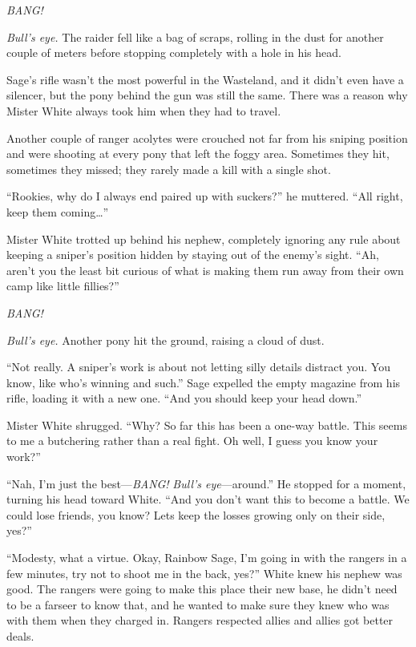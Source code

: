 \emph{BANG!}

\emph{Bull's eye.} The raider fell like a bag of scraps, rolling in the dust for another couple of meters before stopping completely with a hole in his head.

Sage's rifle wasn't the most powerful in the Wasteland, and it didn't even have a silencer, but the pony behind the gun was still the same. There was a reason why Mister White always took him when they had to travel.

Another couple of ranger acolytes were crouched not far from his sniping position and were shooting at every pony that left the foggy area. Sometimes they hit, sometimes they missed; they rarely made a kill with a single shot.

``Rookies, why do I always end paired up with suckers?'' he muttered. ``All right, keep them coming\dots''

Mister White trotted up behind his nephew, completely ignoring any rule about keeping a sniper's position hidden by staying out of the enemy's sight. ``Ah, aren't you the least bit curious of what is making them run away from their own camp like little fillies?''

\emph{BANG!}

\emph{Bull's eye.} Another pony hit the ground, raising a cloud of dust.

``Not really. A sniper's work is about not letting silly details distract you. You know, like who's winning and such.'' Sage expelled the empty magazine from his rifle, loading it with a new one. ``And you should keep your head down.''

Mister White shrugged. ``Why? So far this has been a one-way battle. This seems to me a butchering rather than a real fight. Oh well, I guess you know your work?''

``Nah, I'm just the best---\emph{BANG!} \emph{Bull's eye}---around.'' He stopped for a moment, turning his head toward White. ``And you don't want this to become a battle. We could lose friends, you know? Lets keep the losses growing only on their side, yes?''

``Modesty, what a virtue. Okay, Rainbow Sage, I'm going in with the rangers in a few minutes, try not to shoot me in the back, yes?'' White knew his nephew was good. The rangers were going to make this place their new base, he didn't need to be a farseer to know that, and he wanted to make sure they knew who was with them when they charged in. Rangers respected allies and allies got better deals.

